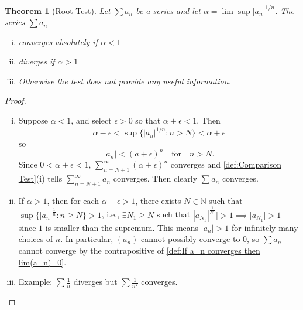 \documentclass[12pt, lettersize]{book}
\theoremstyle{plain}
\newtheorem{thm}{Theorem}[section]
\theoremstyle{definition}
\theoremstyle{remark}
\newcommand{\N}{\mathbb{N}}
\begin{document}
	\begin{thm}[Root Test]\label{def:Root Test}
		Let	$\sum a_n$ be a series and let $\alpha=\lim\sup|a_n|^{1/n}$. The series $\sum a_n$
		\begin{enumerate}[(i)]
			\item converges absolutely if $\alpha<1$
			\item diverges if $\alpha>1$
			\item Otherwise the test does not provide any useful information.
		\end{enumerate}
	\end{thm}
	\begin{proof}
		\begin{enumerate}[(i)]
			\item Suppose $\alpha<1$, and select $\epsilon>0$ so that $\alpha+\epsilon<1$. Then
			\begin{displaymath}
				\alpha-\epsilon<\sup\{|a_n|^{1/n}: n>N\}<\alpha+\epsilon
			\end{displaymath}
			so
			\begin{displaymath}
				|a_n|<(a+\epsilon)^n\quad\text{for}\quad n>N.
			\end{displaymath}
			Since $0<\alpha+\epsilon<1$, $\sum_{n=N+1}^{\infty}(\alpha+\epsilon)^n$ converges and \ref{def:Comparison Test}(i) tells $\sum_{n=N+1}^{\infty}a_n$ converges. Then clearly $\sum a_n$ converges.
			\item If $\alpha>1$, then for each $\alpha-\epsilon>1$, there exists $N\in\N$ such that $\sup\{|a_n|^\frac{1}{n}: n\geq N\}>1$, i.e., $\exists N_1\geq N$ such that $|a_{N_1}|^\frac{1}{N_1}|>1\implies |a_{N_1}|>1$ since $1$ is smaller than the supremum. This means $|a_n|>1$ for infinitely many choices of $n$. In particular, $(a_n)$
			cannot possibly converge to $0$, so $\sum a_n$ cannot converge by the contrapositive of \ref{def:If a_n converges then lim(a_n)=0}.
			\item Example: $\sum\frac{1}{n}$ diverges but $\sum\frac{1}{n^2}$ converges.
		\end{enumerate}
	\end{proof}
	
\end{document}
